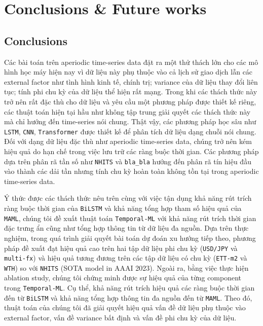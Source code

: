 
\chapter{Conclusions \& Future works}
\label{chap:conclusion}

\section{Conclusions}

Các bài toán trên aperiodic time-series data đặt ra một thử thách lớn cho các mô hình học máy hiện nay vì dữ liệu này phụ thuộc vào cả lịch sử giao dịch lẫn các external factor như tình hình kinh tế, chính trị; variance của dữ liệu thay đổi liên tục; tính phi chu kỳ của dữ liệu thể hiện rất mạng. Trong khi các thách thức này trở nên rất đặc thù cho dữ liệu và yêu cầu một phương pháp được thiết kế riêng, các thuật toán hiện tại hầu như không tập trung giải quyết các thách thức này mà chỉ hướng đến time-series nói chung. Thật vậy, các phương pháp học sâu như \verb|LSTM|, \verb|CNN|, \verb|Transformer| được thiết kế để phân tích dữ liệu dạng chuỗi nói chung. Đối với dạng dữ liệu đặc thù như aperiodic time-series data, chúng trở nên kém hiệu quả do hạn chế trong việc lưu trữ các ràng buộc thời gian. Các phương pháp dựa trên phân rã tần số như \verb|NHITS| và \verb|bla_bla| hướng đến phân rã tín hiệu đầu vào thành các dải tần nhưng tính chu kỳ hoàn toàn không tồn tại trong aperiodic time-series data.

Ý thức được các thách thức nêu trên cùng với việc tận dụng khả năng rút trích ràng buộc thời gian của \verb|BiLSTM| và khả năng tổng hợp tham số hiệu quả của \verb|MAML|, chúng tôi đề xuất thuật toán \verb|Temporal-ML| với khả năng rút trích thời gian đặc trưng ẩn cũng như tổng hợp thông tin từ dữ liệu đa nguồn. Dựa trên thực nghiệm, trong quá trình giải quyết bài toán dự đoán xu hướng tiếp theo, phương pháp đề xuất đạt hiệu quả cao trên hai tập dữ liệu phi chu kỳ (\verb|USD/JPY| và \verb|multi-fx|) và hiệu quả tương đương trên các tập dữ liệu có chu kỳ (\verb|ETT-m2| và \verb|WTH|) so với \verb|NHITS| (SOTA model in AAAI 2023). Ngoài ra, bằng việc thực hiện ablation study, chúng tôi chứng minh được sự hiệu quả của từng component trong \verb|Temporal-ML|. Cụ thể, khả năng rút trích hiệu quả các ràng buộc thời gian đến từ \verb|BiLSTM| và khả năng tổng hợp thông tin đa nguồn đến từ \verb|MAML|. Theo đó, thuật toán của chúng tôi đã giải quyết hiệu quả vấn đề dữ liệu phụ thuộc vào external factor, vấn đề variance bất định và vấn đề phi chu kỳ của dữ liệu.

